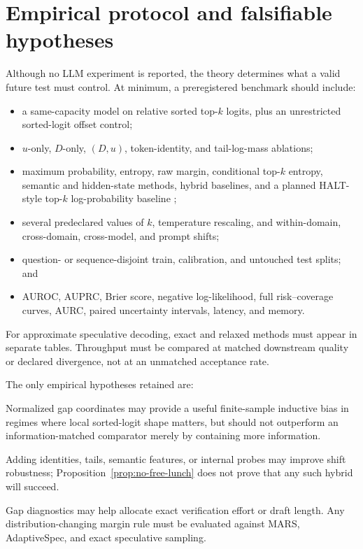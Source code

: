 \documentclass[11pt]{article}
\theoremstyle{definition}
\theoremstyle{remark}
\newcommand{\1}{\mathbf{1}}
\begin{document}
\section{Empirical protocol and falsifiable hypotheses}

Although no LLM experiment is reported, the theory determines what a valid
future test must control.  At minimum, a preregistered benchmark should include:
\begin{itemize}[leftmargin=*,itemsep=2pt]
  \item a same-capacity model on relative sorted top-$k$ logits, plus an
        unrestricted sorted-logit offset control;
  \item $u$-only, $D$-only, $(D,u)$, token-identity, and tail-log-mass ablations;
  \item maximum probability, entropy, raw margin, conditional top-$k$ entropy,
        semantic and hidden-state methods, hybrid baselines, and a planned
        HALT-style top-$k$ log-probability baseline \cite{shapiro2026halt};
  \item several predeclared values of $k$, temperature rescaling, and
        within-domain, cross-domain, cross-model, and prompt shifts;
  \item question- or sequence-disjoint train, calibration, and untouched test
        splits; and
  \item AUROC, AUPRC, Brier score, negative log-likelihood, full risk--coverage
        curves, AURC, paired uncertainty intervals, latency, and memory.
\end{itemize}

For approximate speculative decoding, exact and relaxed methods must appear in
separate tables.  Throughput must be compared at matched downstream quality or
declared divergence, not at an unmatched acceptance rate.

The only empirical hypotheses retained are:
\begin{description}[leftmargin=2.2em,style=nextline,itemsep=3pt]
  \item[H1.] Normalized gap coordinates may provide a useful finite-sample
  inductive bias in regimes where local sorted-logit shape matters, but should
  not outperform an information-matched comparator merely by containing more
  information.
  \item[H2.] Adding identities, tails, semantic features, or internal probes
  may improve shift robustness; Proposition~\ref{prop:no-free-lunch} does not
  prove that any such hybrid will succeed.
  \item[H3.] Gap diagnostics may help allocate exact verification effort or
  draft length.  Any distribution-changing margin rule must be evaluated
  against MARS, AdaptiveSpec, and exact speculative sampling.
\end{description}
\end{document}
